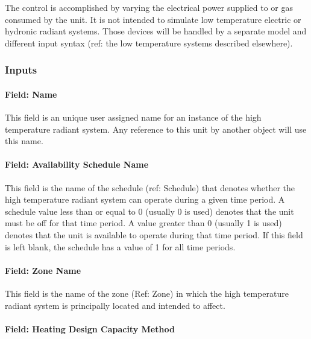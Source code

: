 The control is accomplished by varying the electrical power supplied to or gas consumed by the unit. It is not intended to simulate low temperature electric or hydronic radiant systems. Those devices will be handled by a separate model and different input syntax (ref: the low temperature systems described elsewhere).

\subsubsection{Inputs}\label{inputs-9-015}

\paragraph{Field: Name}\label{field-name-9-013}

This field is an unique user assigned name for an instance of the high temperature radiant system. Any reference to this unit by another object will use this name.

\paragraph{Field: Availability Schedule Name}\label{field-availability-schedule-name-8-003}

This field is the name of the schedule (ref: Schedule) that denotes whether the high temperature radiant system can operate during a given time period. A schedule value less than or equal to 0 (usually 0 is used) denotes that the unit must be off for that time period. A value greater than 0 (usually 1 is used) denotes that the unit is available to operate during that time period. If this field is left blank, the schedule has a value of 1 for all time periods.

\paragraph{Field: Zone Name}\label{field-zone-name-3-004}

This field is the name of the zone (Ref: Zone) in which the high temperature radiant system is principally located and intended to affect.

\paragraph{Field: Heating Design Capacity Method}\label{field-heating-design-capacity-method-7}

